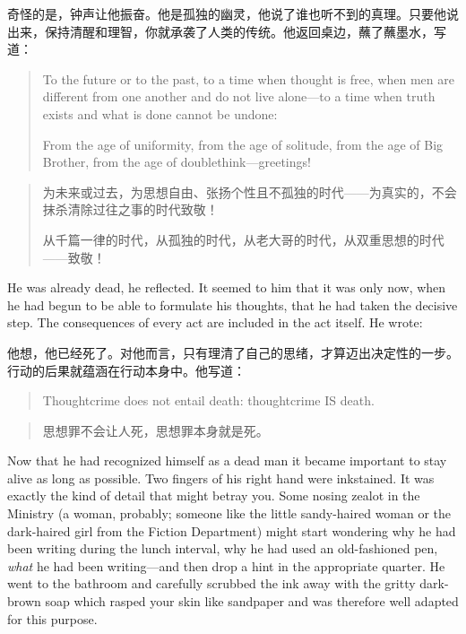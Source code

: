 \begin{paracol}{2}
\switchcolumn

奇怪的是，钟声让他振奋。他是孤独的幽灵，他说了谁也听不到的真理。只要他说出来，保持清醒和理智，你就承袭了人类的传统。他返回桌边，蘸了蘸墨水，写道：

\switchcolumn*

\begin{quotation}
To the future or to the past, to a time when thought is free, when
men are different from one another and do not live alone---to a time
when truth exists and what is done cannot be undone:\par
From the age of uniformity, from the age of solitude, from the age
of Big Brother, from the age of doublethink---greetings!
\end{quotation}

\switchcolumn

\begin{quotation}
为未来或过去，为思想自由、张扬个性且不孤独的时代——为真实的，不会抹杀清除过往之事的时代致敬！\par
从千篇一律的时代，从孤独的时代，从老大哥的时代，从双重思想的时代——致敬！
\end{quotation}

\switchcolumn*

He was already dead, he reflected. It seemed to him that it was only
now, when he had begun to be able to formulate his thoughts, that he had
taken the decisive step. The consequences of every act are included in
the act itself. He wrote:

\switchcolumn

他想，他已经死了。对他而言，只有理清了自己的思绪，才算迈出决定性的一步。行动的后果就蕴涵在行动本身中。他写道：

\switchcolumn*

\begin{quotation}
Thoughtcrime does not entail death: thoughtcrime IS death.
\end{quotation}

\switchcolumn

\begin{quotation}
思想罪不会让人死，思想罪本身就是死。
\end{quotation}

\switchcolumn*

Now that he had recognized himself as a dead man it became important to
stay alive as long as possible. Two fingers of his right hand were
inkstained. It was exactly the kind of detail that might betray you.
Some nosing zealot in the Ministry (a woman, probably; someone like the
little sandy-haired woman or the dark-haired girl from the Fiction
Department) might start wondering why he had been writing during the
lunch interval, why he had used an old-fashioned pen, \emph{what} he had
been writing---and then drop a hint in the appropriate quarter. He went
to the bathroom and carefully scrubbed the ink away with the gritty
dark-brown soap which rasped your skin like sandpaper and was therefore
well adapted for this purpose.


\end{paracol}
